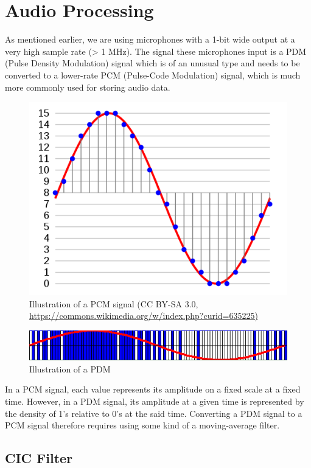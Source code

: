 \documentclass[]{report}
\begin{document}
\hypertarget{audio-processing}{%
\section{Audio Processing}\label{audio-processing}}

As mentioned earlier, we are using microphones with a 1-bit wide output
at a very high sample rate (\textgreater{} 1 MHz). The signal these
microphones input is a PDM (Pulse Density Modulation) signal which is of
an unusual type and needs to be converted to a lower-rate PCM
(Pulse-Code Modulation) signal, which is much more commonly used for
storing audio data.

\begin{figure}[h]
\centering
\includegraphics[width=0.7\linewidth]{Pictures/PCM.png}
\caption{Illustration of a PCM signal (CC BY-SA 3.0, \url{https://commons.wikimedia.org/w/index.php?curid=635225)}}
\end{figure}

\begin{figure}[h]
\centering
\includegraphics[width=1.0\linewidth]{Pictures/PDM.png}
\caption{Illustration of a PDM}
\end{figure}

In a PCM signal, each value represents its amplitude on a fixed scale at
a fixed time. However, in a PDM signal, its amplitude at a given time is
represented by the density of 1's relative to 0's at the said time.
Converting a PDM signal to a PCM signal therefore requires using some
kind of a moving-average filter.

\hypertarget{cic-filter}{%
\subsection{CIC Filter}\label{cic-filter}}
\end{document}
